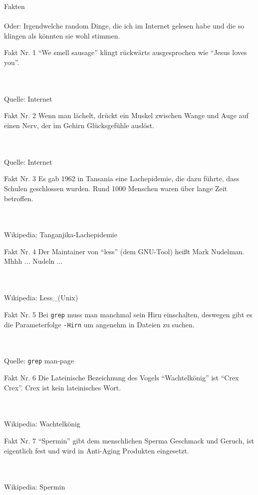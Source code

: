 \documentclass{beamer}
\newenvironment{fakt}[1]
{\begin{frame}{Fakt Nr. #1}\centering}
{\end{frame}}
\newcommand{\rating}[1]{}
\newcommand{\wiki}[1]{\\\hfill\\Wikipedia: #1}
\newcommand{\source}[1]{\\\hfill\\Quelle: #1}
\begin{document}
	\begin{frame}
		\begin{center}
			{\huge Fakten}\\
			\hfill\\\pause
			Oder: Irgendwelche random Dinge, die ich im Internet gelesen habe und die so klingen als könnten sie wohl stimmen.
		\end{center}
	\end{frame}
	
	\begin{fakt}{1}
		"`We smell sausage"' klingt rückwärts ausgesprochen wie "`Jesus loves you"'.
		\rating{4}
		\source{Internet}
	\end{fakt}

	\begin{fakt}{2}
		Wenn man lächelt, drückt ein Muskel zwischen Wange und Auge auf einen Nerv, der im Gehirn Glücksgefühle auslöst.
		\rating{3}
		\source{Internet}
	\end{fakt}

	\begin{fakt}{3}
		Es gab 1962 in Tansania eine Lachepidemie, die dazu führte, dass Schulen geschlossen wurden. Rund 1000 Menschen waren über lange Zeit betroffen.
		\rating{7}
		\wiki{Tanganjika-Lachepidemie}
	\end{fakt}
	
	\begin{fakt}{4}
		Der Maintainer von "`less"' (dem GNU-Tool) heißt Mark Nudelman. \pause Mhhh ... \pause Nudeln ... \pause
		\rating{6}
		\wiki{Less\_(Unix)}
	\end{fakt}

	\begin{fakt}{5}
		Bei \texttt{grep} muss man manchmal sein Hirn einschalten, deswegen gibt es die Parameterfolge \texttt{-Hirn} um angenehm in Dateien zu suchen.
		\rating{10}
		\source{\texttt{grep} man-page}
	\end{fakt}

	\begin{fakt}{6}
		Die Lateinische Bezeichnung des Vogels "`Wachtelkönig"' ist "`Crex Crex"'. \pause
		Crex ist kein lateinisches Wort.
		\rating{8}
		\wiki{Wachtelkönig}
	\end{fakt}

	\begin{fakt}{7}
		"`Spermin"' gibt dem menschlichen Sperma Geschmack und Geruch, ist eigentlich fest und wird in Anti-Aging Produkten eingesetzt.
		\rating{8}
		\wiki{Spermin}
	\end{fakt}
\end{document}
